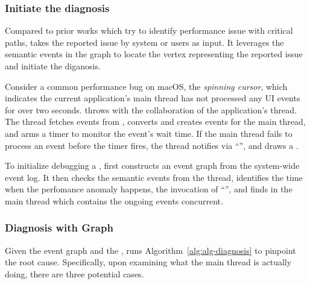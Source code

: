 \subsubsection{Initiate the diagnosis}

Compared to prior works which try to identify performance issue with critical
paths, \xxx takes the reported issue by system or users as input. It leverages
the semantic events in the graph to locate the vertex representing the reported
issue and initiate the diganosis.

Consider a common performance bug on macOS, the \emph{spinning cursor}, which
indicates the current application's main thread has not processed any UI events
for over two seconds.  throws  with the
collaboration of the application's  thread. The 
thread fetches  events from , converts and
creates  events for the main thread, and arms a timer to monitor
the event's wait time. If the main thread fails to process an event before
the timer fires, the  thread notifies  via
``'', and  draws a .

To initialize debugging a , \xxx first constructs an event
graph from the system-wide event log.  It then checks the semantic events from
the  thread, identifies the time when the perfomance anomaly
happens, the invocation of ``'', and finds
\spinningnode in the main thread which contains the ongoing events concurrent.

\subsubsection{Diagnosis with Graph}\label{subsec:debug}



Given the event graph and the \spinningnode, \xxx runs
Algorithm~\ref{alg:alg-diagnosis} to pinpoint the root cause.  Specifically,
upon examining what the main thread is actually doing, there are three
potential cases.

